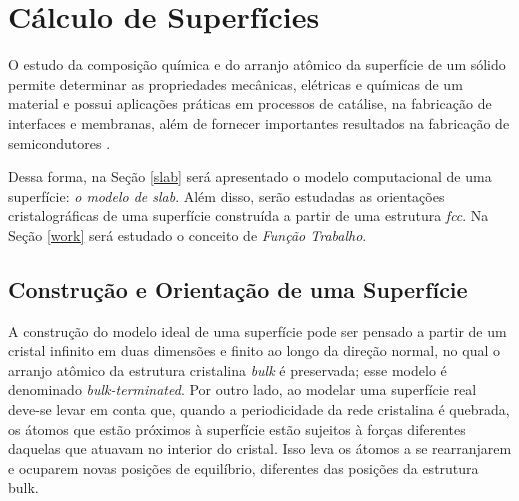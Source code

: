 \chapter{Cálculo de Superfícies}

O estudo da composição química e do arranjo atômico da superfície de um sólido permite determinar as propriedades mecânicas, elétricas e químicas de um material e possui aplicações práticas em processos de catálise, na fabricação de interfaces e membranas, além de fornecer importantes resultados na fabricação de semicondutores \cite{density-book}.

Dessa forma, na Seção \ref{slab} será apresentado o modelo computacional de uma superfície: \textit{o modelo de slab}. Além disso, serão estudadas as orientações cristalográficas de uma superfície construída a partir de uma estrutura \textit{fcc}. Na Seção \ref{work} será estudado o conceito de \textit{Função Trabalho}.
\section{Construção e Orientação de uma Superfície\label{slab}}

A construção do modelo ideal de uma superfície pode ser pensado a partir de um cristal infinito em duas dimensões e finito ao longo da direção normal, no qual o arranjo atômico da estrutura cristalina \textit{bulk} é preservada; esse modelo é denominado \textit{bulk-terminated}. Por outro lado, ao modelar uma superfície real deve-se levar em conta que, quando a periodicidade da rede cristalina é quebrada, os átomos que estão próximos à superfície estão sujeitos à forças diferentes daquelas que atuavam no interior do cristal. Isso leva os átomos a se rearranjarem e ocuparem novas posições de equilíbrio, diferentes das posições da estrutura bulk. %

